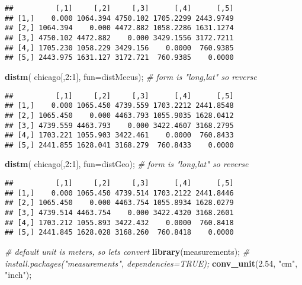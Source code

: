 \documentclass[
]{article}
\newenvironment{Shaded}{\begin{snugshade}}{\end{snugshade}}
\newcommand{\CommentTok}[1]{\textcolor[rgb]{0.56,0.35,0.01}{\textit{#1}}}
\newcommand{\DataTypeTok}[1]{\textcolor[rgb]{0.13,0.29,0.53}{#1}}
\newcommand{\DecValTok}[1]{\textcolor[rgb]{0.00,0.00,0.81}{#1}}
\newcommand{\FloatTok}[1]{\textcolor[rgb]{0.00,0.00,0.81}{#1}}
\newcommand{\KeywordTok}[1]{\textcolor[rgb]{0.13,0.29,0.53}{\textbf{#1}}}
\newcommand{\NormalTok}[1]{#1}
\newcommand{\OperatorTok}[1]{\textcolor[rgb]{0.81,0.36,0.00}{\textbf{#1}}}
\newcommand{\StringTok}[1]{\textcolor[rgb]{0.31,0.60,0.02}{#1}}
\begin{document}
\begin{verbatim}
##          [,1]     [,2]     [,3]      [,4]      [,5]
## [1,]    0.000 1064.394 4750.102 1705.2299 2443.9749
## [2,] 1064.394    0.000 4472.882 1058.2286 1631.1274
## [3,] 4750.102 4472.882    0.000 3429.1556 3172.7211
## [4,] 1705.230 1058.229 3429.156    0.0000  760.9385
## [5,] 2443.975 1631.127 3172.721  760.9385    0.0000
\end{verbatim}

\begin{Shaded}
\begin{Highlighting}[]
\KeywordTok{distm}\NormalTok{( chicago[,}\DecValTok{2}\OperatorTok{:}\DecValTok{1}\NormalTok{], }\DataTypeTok{fun=}\NormalTok{distMeeus);  }\CommentTok{\# form is "long,lat" so reverse }
\end{Highlighting}
\end{Shaded}

\begin{verbatim}
##          [,1]     [,2]     [,3]      [,4]      [,5]
## [1,]    0.000 1065.450 4739.559 1703.2212 2441.8548
## [2,] 1065.450    0.000 4463.793 1055.9035 1628.0412
## [3,] 4739.559 4463.793    0.000 3422.4607 3168.2795
## [4,] 1703.221 1055.903 3422.461    0.0000  760.8433
## [5,] 2441.855 1628.041 3168.279  760.8433    0.0000
\end{verbatim}

\begin{Shaded}
\begin{Highlighting}[]
\KeywordTok{distm}\NormalTok{( chicago[,}\DecValTok{2}\OperatorTok{:}\DecValTok{1}\NormalTok{], }\DataTypeTok{fun=}\NormalTok{distGeo);  }\CommentTok{\# form is "long,lat" so reverse }
\end{Highlighting}
\end{Shaded}

\begin{verbatim}
##          [,1]     [,2]     [,3]      [,4]      [,5]
## [1,]    0.000 1065.450 4739.514 1703.2122 2441.8446
## [2,] 1065.450    0.000 4463.754 1055.8934 1628.0279
## [3,] 4739.514 4463.754    0.000 3422.4320 3168.2601
## [4,] 1703.212 1055.893 3422.432    0.0000  760.8418
## [5,] 2441.845 1628.028 3168.260  760.8418    0.0000
\end{verbatim}

\begin{Shaded}
\begin{Highlighting}[]
\CommentTok{\# default unit is meters, so let\textquotesingle{}s convert}
\KeywordTok{library}\NormalTok{(measurements); }\CommentTok{\# install.packages("measurements", dependencies=TRUE);}
\KeywordTok{conv\_unit}\NormalTok{(}\FloatTok{2.54}\NormalTok{, }\StringTok{"cm"}\NormalTok{, }\StringTok{"inch"}\NormalTok{);}
\end{Highlighting}
\end{Shaded}
\end{document}
